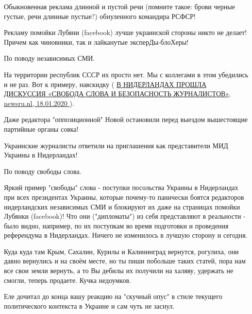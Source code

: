 \begin{itemize}
Обыкновенная реклама длинной и пустой речи (помните такое: брови черные густые,
речи длинные пустые?) обнуленного командира РСФСР! \Smiley[1.0][yellow]

Рекламу помойки Лубяни (facebook) лучше украинской стороны никто не делает! \Smiley[1.0][yellow]
Причем как чиновники, так и лайканутые эксперДы-блоХеры! \Smiley[1.0][yellow]

По поводу независимых СМИ.

На территории республик СССР их просто нет. Мы с коллегами в этом убедились и
не раз. Вот к примеру, навскидку
( \href{http://www.newsru.nl/index.php/ru/events/2600}{%
В НИДЕРЛАНДАХ ПРОШЛА ДИСКУССИЯ «СВОБОДА СЛОВА И БЕЗОПАСНОСТЬ ЖУРНАЛИСТОВ»,%
newsru.nl, 18.01.2020%
}).

Даже редактора "оппозиционной"
Новой остановили перед выездом вышестоящие партийные органы совка! \Smiley[1.0][yellow]

Украинские журналисты ответили на приглашения как представители МИД Украины в
Нидерландах! \Smiley[1.0][yellow]

По поводу свободы слова.

Яркий пример "свободы" слова - поступки посольства Украины в Нидерландах при
всех президентах Украины, которые почему-то панически боятся редакторов
нидерландских независимых СМИ и блокируют их даже на страницах помойки Лубянки
(facebook)! \Smiley[1.0][yellow] Что они ("дипломаты") из себя представляют в
реальности - было видно, например, по их поступкам во время подготовки и
проведения референдума в Нидерландах. Ничего не изменилось в лучшую сторону и
сегодня.

 

Куда куда там Крым, Сахалин, Курилы и Калининград вернутся, рогулиха, они давно
вернулись и на своём месте, но ты пиши побольше таких статей, пора нам все свои
земли вернуть, а то Вы дебилы их получили на халяву, удержать не смогли, теперь
продаете. Кучка недоумков.


 

Еле дочитал до конца вашу реакцию на "скучный опус" в стиле текущего
политического контекста в Украине и сам чуть не заснул.🤣


\end{itemize}
